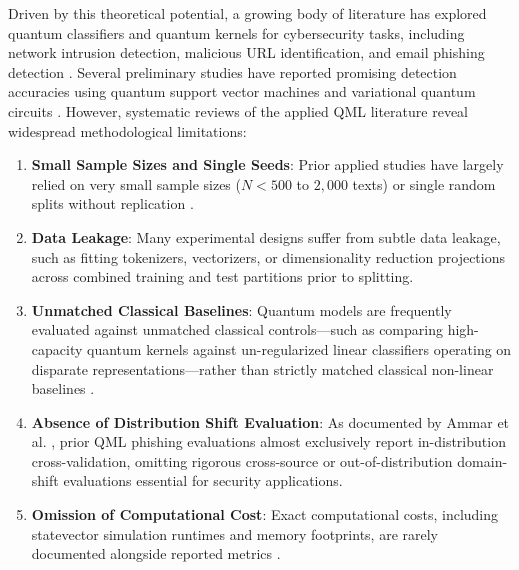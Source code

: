 \documentclass[10pt,twocolumn,letterpaper]{article}
\begin{document}
Driven by this theoretical potential, a growing body of literature has explored quantum classifiers and quantum kernels for cybersecurity tasks, including network intrusion detection, malicious URL identification, and email phishing detection \cite{hridi2026batch,guddanti2026detecting,shahriyar2025phishvqc,sagingalieva2022quantum}. Several preliminary studies have reported promising detection accuracies using quantum support vector machines and variational quantum circuits \cite{garg2024quantum,shukla2023quantum}. However, systematic reviews of the applied QML literature \cite{ammar2026quantum,li2026large} reveal widespread methodological limitations:
\begin{enumerate}
    \item \textbf{Small Sample Sizes and Single Seeds}: Prior applied studies have largely relied on very small sample sizes ($N < 500$ to $2,000$ texts) or single random splits without replication \cite{hridi2026batch,garg2024quantum}.
    \item \textbf{Data Leakage}: Many experimental designs suffer from subtle data leakage, such as fitting tokenizers, vectorizers, or dimensionality reduction projections across combined training and test partitions prior to splitting.
    \item \textbf{Unmatched Classical Baselines}: Quantum models are frequently evaluated against unmatched classical controls---such as comparing high-capacity quantum kernels against un-regularized linear classifiers operating on disparate representations---rather than strictly matched classical non-linear baselines \cite{shahriyar2025phishvqc,shukla2023quantum}.
    \item \textbf{Absence of Distribution Shift Evaluation}: As documented by Ammar et al. \cite{ammar2026quantum}, prior QML phishing evaluations almost exclusively report in-distribution cross-validation, omitting rigorous cross-source or out-of-distribution domain-shift evaluations essential for security applications.
    \item \textbf{Omission of Computational Cost}: Exact computational costs, including statevector simulation runtimes and memory footprints, are rarely documented alongside reported metrics \cite{li2026large}.
\end{enumerate}
\end{document}
